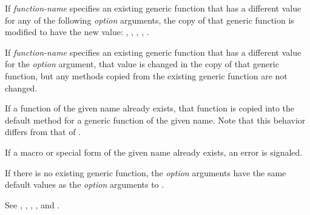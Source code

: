\begin{defspec}
If {\it function-name\/} specifies an existing generic function that has a
different value for any of the following {\it option\/} arguments, the
copy of that generic function is modified to have the new value: 
, , , 
, .

If {\it function-name\/} specifies an existing generic function that has a
different value for the  {\it option\/} argument,
that value is changed in the copy of that generic function, but any
methods copied from the existing generic function are not changed.

If a function of the given name already exists, that function is copied into
the default method for a generic function of the given name.  Note that
this behavior differs from that of .

If a macro or special form of the given name already exists, an error
is signaled.

If there is no existing generic function, the {\it option\/} arguments have
the same default values as the {\it option\/} arguments to .

See ,
,
,
,
and .
\end{defspec}


